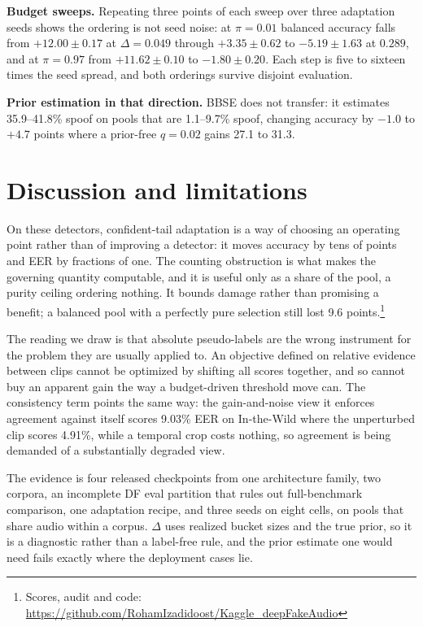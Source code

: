 \documentclass[10pt,letterpaper]{article}
\begin{document}
\textbf{Budget sweeps.} Repeating three points of each sweep over three
adaptation seeds shows the ordering is not seed noise: at $\pi=0.01$ balanced
accuracy falls from $+12.00\pm0.17$ at $\Delta=0.049$ through $+3.35\pm0.62$ to
$-5.19\pm1.63$ at $0.289$, and at $\pi=0.97$ from $+11.62\pm0.10$ to
$-1.80\pm0.20$. Each step is five to sixteen times the seed spread, and both
orderings survive disjoint evaluation.

\textbf{Prior estimation in that direction.} BBSE does not transfer: it
estimates 35.9--41.8\% spoof on pools that are 1.1--9.7\% spoof, changing
accuracy by $-1.0$ to $+4.7$ points where a prior-free $q=0.02$ gains 27.1 to
31.3.

\section{Discussion and limitations}
On these detectors, confident-tail adaptation is a way of choosing an operating
point rather than of improving a detector: it moves accuracy by tens of points
and EER by fractions of one. The counting obstruction is what makes the
governing quantity computable, and it is useful only as a share of the pool, a
purity ceiling ordering nothing. It bounds damage rather than promising a
benefit; a balanced pool with a perfectly pure selection still lost 9.6
points.\footnote{Scores, audit and code:
\url{https://github.com/RohamIzadidoost/Kaggle_deepFakeAudio}}

The reading we draw is that absolute pseudo-labels are the wrong instrument for
the problem they are usually applied to. An objective defined on relative
evidence between clips cannot be optimized by shifting all scores together, and
so cannot buy an apparent gain the way a budget-driven threshold move can. The
consistency term points the same way: the gain-and-noise view it enforces
agreement against itself scores 9.03\% EER on In-the-Wild where the unperturbed
clip scores 4.91\%, while a temporal crop costs nothing, so agreement is being
demanded of a substantially degraded view.

The evidence is four released checkpoints from one architecture family, two
corpora, an incomplete DF eval partition that rules out full-benchmark
comparison, one adaptation recipe, and three seeds on eight cells, on pools
that share audio within a corpus. $\Delta$ uses realized bucket sizes and the
true prior, so it is a diagnostic rather than a label-free rule, and the prior
estimate one would need fails exactly where the deployment cases lie.
\end{document}
